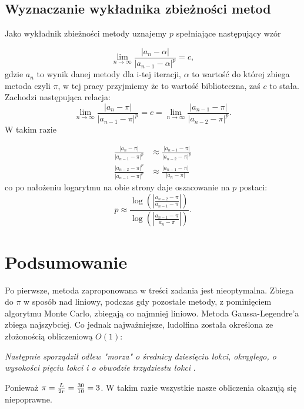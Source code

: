 \documentclass[11pt, wide, leqno]{mwart}
\begin{document}
\subsection{Wyznaczanie wykładnika zbieżności metod}

Jako wykładnik zbieżności metody uznajemy $p$ spełniające następujący wzór \cite{bog}

\[\lim_{n \to \infty} \frac{|a_n - \alpha|}{|a_{n-1} - \alpha|^p} = c,  \]
gdzie $a_n$ to wynik danej metody dla i-tej iteracji, $\alpha$ to wartość do której zbiega metoda czyli $\pi$, w tej pracy przyjmiemy że to wartość biblioteczna, zaś $c$ to stała. Zachodzi następująca relacja:
\[ \lim_{n \to \infty} \frac{|a_n - \pi|}{|a_{n-1} - \pi|^p} = c = \lim_{n \to \infty} \frac{|a_{n-1} - \pi|}{|a_{n-2} - \pi|^p}. \]
W takim razie 

\begin{align*}
    \frac{|a_n - \pi|}{|a_{n-1} - \pi|^p} &\approx \frac{|a_{n-1} - \pi|}{|a_{n-2} - \pi|^p}\\
    \frac{|a_{n-2} - \pi|^p}{|a_{n-1} - \pi|^p} &\approx \frac{|a_{n-1} - \pi|}{|a_{n} - \pi|}
\end{align*}
co po nałożeniu logarytmu na obie strony daje oszacowanie na $p$ postaci:
\[ p \approx \frac{\log(|\frac{a_{n-2} - \pi}{a_{n-1} - \pi}|)}{\log(|\frac{a_{n-1} - \pi}{a_{n} - \pi}|)}.
\]









\newpage

\section{Podsumowanie}

Po pierwsze, metoda zaproponowana w treści zadania jest nieoptymalna. Zbiega do $\pi$ w sposób nad liniowy, podczas gdy pozostałe metody, z pominięciem algorytmu Monte Carlo, zbiegają co najmniej liniowo. Metoda Gaussa-Legendre'a zbiega najszybciej. Co jednak najważniejsze, ludolfina została określona ze złożonością obliczeniową $O(1)$: 

\begin{center}
    \emph{Następnie sporządził odlew "morza" o średnicy dziesięciu łokci, okrągłego, o wysokości pięciu łokci i o obwodzie trzydziestu łokci} \cite{biblia}. 
\end{center}
Ponieważ $\pi={L\over 2r}={30\over 10}=3$. W takim razie wszystkie nasze obliczenia okazują się niepoprawne.
\end{document}

